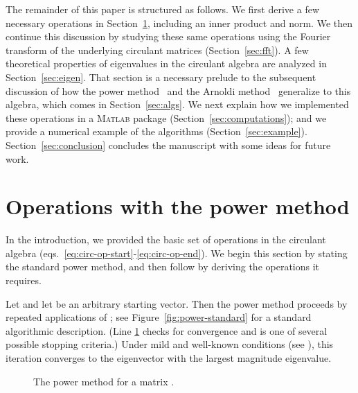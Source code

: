 \documentclass[1p,authoryear,letterpaper]{elsarticle}
\renewcommand{\cite}{\citep}
\newcommand{\Matlab}{\textsc{Matlab}\xspace}
\begin{document}
The remainder of this paper is structured as follows.
We first derive a few necessary operations in Section~\ref{sec:ops}, 
including an inner product and norm. We then continue this discussion by studying these same operations 
using the Fourier transform of the underlying circulant matrices 
(Section~\ref{sec:fft}).  A few theoretical properties of eigenvalues 
in the circulant algebra are analyzed in Section~\ref{sec:eigen}.  
That section is a necessary prelude to the subsequent discussion of 
how the power method~\cite{vonMises1929-power} and the Arnoldi 
method~\cite{Krylov1931-equations,lanczos1950-iteration,Arnoldi1951-minimized}
 generalize to this algebra, 
which comes in Section~\ref{sec:algs}.
We next explain how we implemented these operations in a \Matlab 
package (Section~\ref{sec:computations}); and we provide a numerical 
example of the algorithms (Section~\ref{sec:example}).  
Section~\ref{sec:conclusion} concludes the manuscript with some 
ideas for future work.






\section{Operations with the power method}
\label{sec:ops}

In the introduction, we provided the basic set of operations in the circulant algebra 
(eqs.~\eqref{eq:circ-op-start}-\eqref{eq:circ-op-end}).  We begin this section by stating the standard power method, and then follow by deriving the operations it requires.

Let  and let  be an arbitrary starting vector.  Then the power method proceeds by repeated applications of ; see Figure~\ref{fig:power-standard} for a standard algorithmic description. (Line \ref{alg:power:conv} checks for convergence and is one of several possible stopping criteria.) Under mild and well-known conditions (see \citet{Stewart2001-eigensystems}), this iteration converges to the eigenvector with the largest magnitude eigenvalue.

\begin{figure}
\caption{The power method for a matrix .
}
\label{fig:power-standard}
\begin{algorithmic}[1]
\REQUIRE  
\STATE 
{}
  \STATE 
  \STATE 
  \STATE 
  \IF {} \label{alg:power:conv}
    \RETURN 
  \ENDIF
\ENDFOR
\end{algorithmic}
\end{figure}
\end{document}
